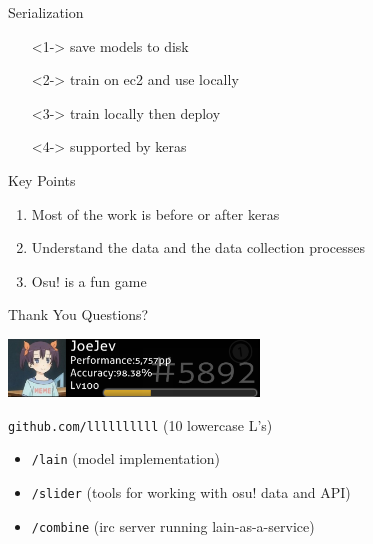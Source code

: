 \documentclass[table]{beamer}
\begin{document}
\begin{frame}{Serialization}
  \begin{itemize}
  \item[]<1-> save models to disk
  \item[]<2-> train on ec2 and use locally
  \item[]<3-> train locally then deploy
  \item[]<4-> supported by keras
  \end{itemize}
\end{frame}

\begin{frame}{Key Points}
  \begin{enumerate}
  \item<1-> Most of the work is before or after keras
  \item<2-> Understand the data and the data collection processes
  \item<3-> Osu! is a fun game
  \end{enumerate}
\end{frame}

\begin{frame}{Thank You}
  Questions?

  \begin{center}
    \includegraphics[width=0.50\textwidth]{images/osu-profile.png}
  \end{center}

  \begin{block}{\texttt{github.com/llllllllll} (10 lowercase L's)}
    \begin{itemize}
    \item \texttt{/lain} (model implementation)
    \item \texttt{/slider} (tools for working with osu! data and API)
    \item \texttt{/combine} (irc server running lain-as-a-service)
    \end{itemize}
  \end{block}
\end{frame}
\end{document}
